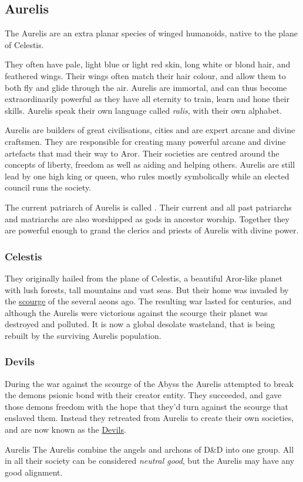 \subsection{Aurelis}
\label{sec:Aurelis}

The Aurelis are an extra planar species of winged humanoids, native to the plane
of Celestis.

They often have pale, light blue or light red skin, long white or blond hair,
and feathered wings. Their wings often match their hair colour, and allow them
to both fly and glide through the air. Aurelis are immortal, and can thus become
extraordinarily powerful as they have all eternity to train, learn and hone
their skills. Aurelis speak their own language called \emph{ralis}, with
their own alphabet.

Aurelis are builders of great civilisations, cities and are expert arcane and
divine craftsmen. They are responsible for creating many powerful arcane and
divine artefacts that mad their way to Aror. Their societies are centred
around the concepts of liberty, freedom as well as aiding and helping
others. Aurelis are still lead by one high king or queen, who rules mostly
symbolically while an elected council runs the society.

The current patriarch of Aurelis is called . Their current
and all past patriarchs and matriarchs are also worshipped as gods in ancestor
worship. Together they are powerful enough to grand the clerics and priests
of Aurelis with divine power.

\subsubsection{Celestis}
\label{sec:Celestis}

They originally hailed from the plane of Celestis, a beautiful Aror-like planet
with lush forests, tall mountains and vast seas. But their home
was invaded by the \hyperref[sec:Scourge]{scourge} of the 
several aeons ago. The resulting war lasted for centuries, and although the
Aurelis were victorious against the scourge their planet was destroyed and
polluted. It is now a global desolate wasteland, that is being rebuilt by the
surviving Aurelis population.

\subsubsection{Devils}

During the war against the scourge of the Abyss the Aurelis attempted to break
the demons psionic bond with their creator entity. They succeeded, and gave
those demons freedom with the hope that they'd turn against the scourge that
enslaved them. Instead they retreated from Aurelis to create their own
societies, and are now known as the \hyperref[sec:devils]{Devils}.

\begin{35e}{Aurelis}
  The Aurelis combine the angels and archons of D\&D into one group. All in all
  their society can be considered \emph{neutral good}, but the Aurelis may have
  any good alignment.
\end{35e}
